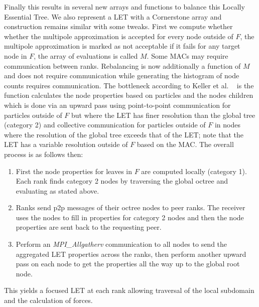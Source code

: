 Finally this results in several new arrays and functions to balance this Locally Essential Tree. We also represent a LET with a Cornerstone array and construction remains similar with some tweaks. First we compute whether whether the multipole approximation is accepted for every node outside of $F$, the multipole approximation is marked as not acceptable if it fails for any target node in $F$, the array of evaluations is called $M$. Some MACs may require communication between ranks. Rebalancing is now additionally a function of $M$ and does not require communication while generating the histogram of node counts requires communication. The bottleneck according to Keller et al. ~\cite{cornerstone} is the function calculates the node properties based on particles and the nodes children which is done via an upward pass using point-to-point communication for particles outside of $F$ but where the LET has finer resolution than the global tree (category 2) and collective communication for particles outside of $F$ in nodes where the resolution of the global tree exceeds that of the LET; note that the LET has a variable resolution outside of $F$ based on the MAC. The overall process is as follows then:
\begin{enumerate}
    \item First the node properties for leaves in $F$ are computed locally (category 1). Each rank finds category 2 nodes by traversing the global octree and evaluating as stated above. 
    \item Ranks send p2p messages of their octree nodes to peer ranks. The receiver uses the nodes to fill in properties for category 2 nodes and then the node properties are sent back to the requesting peer.
    \item Perform an \textit{MPI\_Allgatherv} communication to all nodes to send the aggregated LET properties across the ranks, then perform another upward pass on each node to get the properties all the way up to the global root node.
\end{enumerate}

This yields a focused LET at each rank allowing traversal of the local subdomain and the calculation of forces. 
